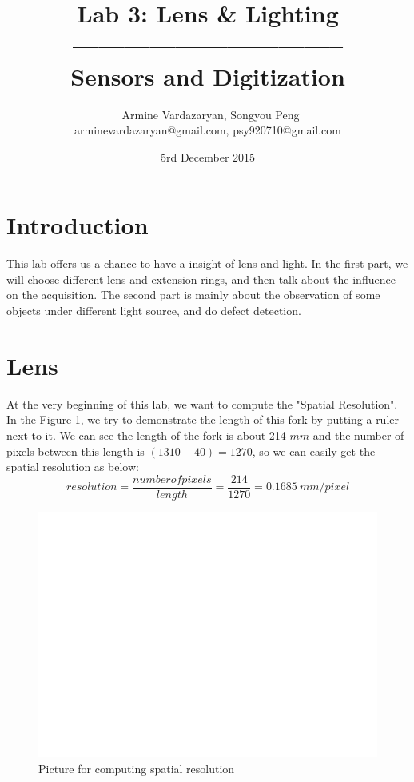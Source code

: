 \documentclass[english]{article}
\begin{document}
\title{Lab 3: Lens \& Lighting\\ -------------------------------- \\ \Large Sensors and Digitization}
\author{ \ Armine Vardazaryan, Songyou Peng \\ arminevardazaryan@gmail.com, psy920710@gmail.com}
\date{5rd December 2015}

\maketitle

\section{Introduction}
This lab offers us a chance to have a insight of lens and light.
In the first part, we will choose different lens and extension rings, and then talk about the influence on the acquisition.
The second part is mainly about the observation of some objects under different light source, and do defect detection. 

\section{Lens}
At the very beginning of this lab, we want to compute the "Spatial Resolution". In the Figure \ref{fig:one}, we try to demonstrate the length of this fork by putting a ruler next to it.
We can see the length of the fork is about 214 $mm$ and the number of pixels between this length is $(1310 - 40) = 1270$, so we can easily get the spatial resolution as below:
$$
resolution = \frac{number of pixels}{length} = \frac{214}{1270} = 0.1685\ mm/pixel
$$
\begin{figure}[H]
	\centering
	\includegraphics[width=1\linewidth]{Pictures/spatial_resolution.png}
	\caption{Picture for computing spatial resolution}
	\label{fig:one}
\end{figure} 
\end{document}
